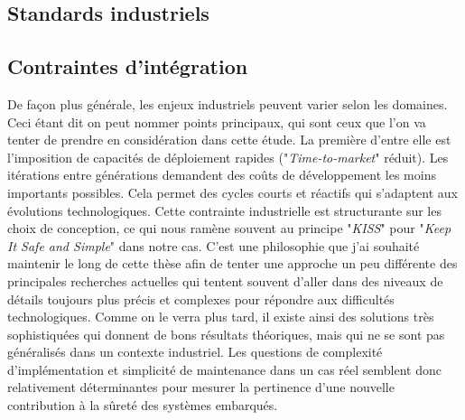 \documentclass[french, a4paper, 11pt, twoside, pdftex]{StyleThese}
\begin{document}


	\subsection{Standards industriels}
	
	
	\subsection{Contraintes d'intégration}
			
	De façon plus générale, les enjeux industriels peuvent varier selon les domaines. Ceci étant dit on peut nommer points principaux, qui sont ceux que l'on va tenter de prendre en considération dans cette étude. La première d'entre elle est l'imposition de capacités de déploiement rapides ("\textit{Time-to-market}" réduit). Les itérations entre générations demandent des coûts de développement les moins importants possibles. Cela permet des cycles courts et réactifs qui s'adaptent aux évolutions technologiques. Cette contrainte industrielle est structurante sur les choix de conception, ce qui nous ramène souvent au principe "\emph{KISS}" pour "\emph{Keep It Safe and Simple}" dans notre cas. C'est une philosophie que j'ai souhaité maintenir le long de cette thèse afin de tenter une approche un peu différente des principales recherches actuelles qui tentent souvent d'aller dans des niveaux de détails toujours plus précis et complexes pour répondre aux difficultés technologiques. Comme on le verra plus tard, il existe ainsi des solutions très sophistiquées qui donnent de bons résultats théoriques, mais qui ne se sont pas généralisés dans un contexte industriel. Les questions de complexité d'implémentation et simplicité de maintenance dans un cas réel semblent donc relativement déterminantes pour mesurer la pertinence d'une nouvelle contribution à la sûreté des systèmes embarqués.
	
\end{document}
